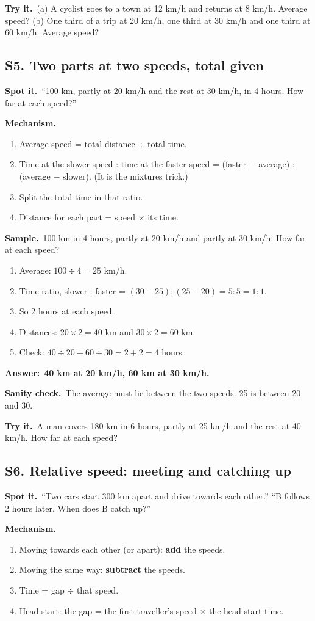 \documentclass[11pt,a4paper]{article}
\let\oldsubsection\subsection
\renewcommand{\subsection}{\needspace{9\baselineskip}\oldsubsection}
\newcommand{\spot}{\textbf{\color{ember}Spot it.}\ }
\newcommand{\mech}{\textbf{\color{ember}Mechanism.}\ }
\newif\ifkeepsamp
\newcommand{\ans}[1]{\par\nopagebreak\noindent\textbf{\color{ember}Answer:}\ \textbf{#1}\par}
\newcommand{\samp}{\ifkeepsamp\needspace{4\baselineskip}\fi\textbf{\color{ember}Sample.}\ }
\newcommand{\sane}{\textbf{\color{slate}Sanity check.}\ }
\newcommand{\tryit}[1]{\textbf{\color{ember}Try it.}\ #1}
\begin{document}
\tryit (a) A cyclist goes to a town at 12 km/h and returns at 8 km/h. Average speed? (b) One third of a trip at 20 km/h, one third at 30 km/h and one third at 60 km/h. Average speed?

\subsection{S5. Two parts at two speeds, total given}
\spot ``100 km, partly at 20 km/h and the rest at 30 km/h, in 4 hours. How far at each speed?''

\mech
\begin{enumerate}
\item Average speed = total distance $\div$ total time.
\item Time at the slower speed : time at the faster speed = (faster $-$ average) : (average $-$ slower). (It is the mixtures trick.)
\item Split the total time in that ratio.
\item Distance for each part = speed $\times$ its time.
\end{enumerate}

\samp 100 km in 4 hours, partly at 20 km/h and partly at 30 km/h. How far at each speed?
\begin{enumerate}
\item Average: $100 \div 4 = 25$ km/h.
\item Time ratio, slower : faster = $(30 - 25) : (25 - 20) = 5 : 5 = 1 : 1$.
\item So 2 hours at each speed.
\item Distances: $20 \times 2 = 40$ km and $30 \times 2 = 60$ km.
\item Check: $40 \div 20 + 60 \div 30 = 2 + 2 = 4$ hours.
\end{enumerate}
\ans{40 km at 20 km/h, 60 km at 30 km/h.}

\sane The average must lie between the two speeds. 25 is between 20 and 30.

\tryit A man covers 180 km in 6 hours, partly at 25 km/h and the rest at 40 km/h. How far at each speed?

\subsection{S6. Relative speed: meeting and catching up}
\spot ``Two cars start 300 km apart and drive towards each other.'' ``B follows 2 hours later. When does B catch up?''

\mech
\begin{enumerate}
\item Moving towards each other (or apart): \textbf{add} the speeds.
\item Moving the same way: \textbf{subtract} the speeds.
\item Time = gap $\div$ that speed.
\item Head start: the gap = the first traveller's speed $\times$ the head-start time.
\end{enumerate}
\end{document}
